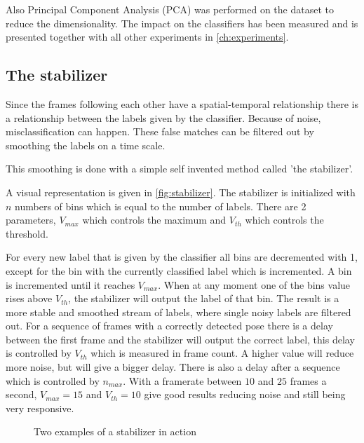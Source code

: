Also Principal Component Analysis (PCA) was performed on the dataset to reduce the dimensionality. The impact on the classifiers has been measured and is presented together with all other experiments in \autoref{ch:experiments}.

\subsection*{The stabilizer}
Since the frames following each other have a spatial-temporal relationship there is a relationship between the labels given by the classifier. Because of noise, misclassification can happen. These false matches can be filtered out by smoothing the labels on a time scale.

This smoothing is done with a simple self invented method called 'the stabilizer'. 

A visual representation is given in \autoref{fig:stabilizer}. The stabilizer is initialized with $n$ numbers of bins which is equal to the number of labels. There are 2 parameters, $V_{max}$ which controls the maximum and $V_{th}$ which controls the threshold.

For every new label that is given by the classifier all bins are decremented with 1, except for the bin with the currently classified label which is incremented. A bin is incremented until it reaches $V_{max}$. When at any moment one of the bins value rises above $V_{th}$, the stabilizer will output the label of that bin. The result is a more stable and smoothed stream of labels, where single noisy labels are filtered out. For a sequence of frames with a correctly detected pose there is a delay between the first frame and the stabilizer will output the correct label, this delay is controlled by $V_{th}$ which is measured in frame count. A higher value will reduce more noise, but will give a bigger delay. There is also a delay after a sequence which is controlled by $n_{max}$. With a framerate between $10$ and $25$ frames a second, $V_{max} = 15$ and $V_{th} = 10$ give good results reducing noise and still being very responsive. 

\begin{figure}[htbp]
  \centering
{}
\hspace{0.03\linewidth}
  \caption{Two examples of a stabilizer in action}
  \label{fig:stabilizer}
\end{figure}




